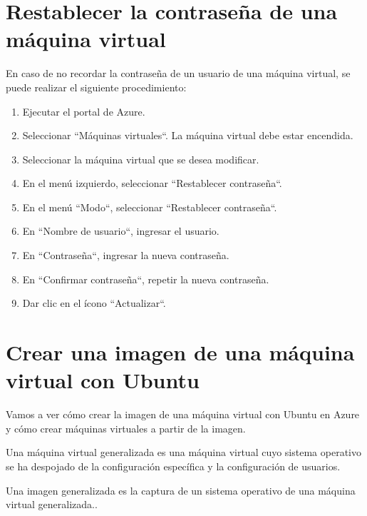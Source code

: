 \section{Restablecer la contraseña de una máquina virtual}

En caso de no recordar la contraseña de un usuario de una máquina virtual, se puede realizar el siguiente procedimiento:

\begin{enumerate}

\item Ejecutar el portal de Azure.

\item Seleccionar ``Máquinas virtuales``. La máquina virtual debe estar encendida.

\item Seleccionar la máquina virtual que se desea modificar.

\item En el menú izquierdo, seleccionar ``Restablecer contraseña``.

\item En el menú ``Modo``, seleccionar ``Restablecer contraseña``.

\item En ``Nombre de usuario``, ingresar el usuario.

\item En ``Contraseña``, ingresar la nueva contraseña.

\item En ``Confirmar contraseña``, repetir la nueva contraseña.

\item Dar clic en el ícono ``Actualizar``.

\end{enumerate}

\section{Crear una imagen de una máquina virtual con Ubuntu}

Vamos a ver cómo crear la imagen de una máquina virtual con Ubuntu en Azure y cómo crear máquinas virtuales a partir de la imagen.

Una máquina virtual generalizada es una máquina virtual cuyo sistema operativo se ha despojado de la configuración específica y la configuración de usuarios.

Una imagen generalizada es la captura de un sistema operativo de una máquina virtual generalizada..

